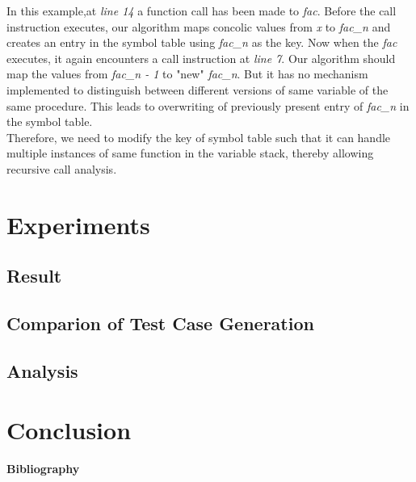 \documentclass[12pt,oneside]{book}
\begin{document}
In this example,at \textit{line 14} a function call has been made to \textit{fac}. Before the call instruction executes, our algorithm maps concolic values from \textit{x} to \textit{fac\_n} and creates an entry in the symbol table using \textit{fac\_n} as the key. Now when the \textit{fac} executes, it again encounters a call instruction at \textit{line 7}. Our algorithm should map the values from \textit{fac\_n - 1} to "new" \textit{fac\_n}. But it has no mechanism implemented to distinguish between different versions of same variable of the same procedure. This leads to overwriting of previously present entry of \textit{fac\_n} in the symbol table.\\
Therefore, we need to modify the key of symbol table such that it can handle multiple instances of same function in the variable stack, thereby allowing recursive call analysis.


 

\chapter{Experiments}
\section{Result}
\section{Comparion of Test Case Generation}
\section{Analysis}

\chapter{Conclusion}
\newpage

\begin{center}
\textbf{\Large{Bibliography}}
\end{center}
\end{document}
